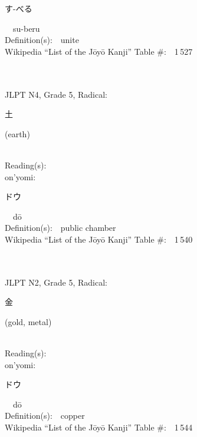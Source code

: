 \begin{multicols}{2}
{\hspace*{2em}}{\begin{CJK}{UTF8}{min} す-べる \end{CJK}}\ \ su-beru\ \ \\
Definition(s):\ \ unite \\
Wikipedia ``List of the J\=oy\=o Kanji'' Table \#:\ \ 1\,527 \\
\ \ \\
{\fontsize{34pt}{40pt}  }\ \ \\  %
{JLPT N4, Grade 5, Radical:\ \ {\begin{CJK}{UTF8}{min} 土 \end{CJK}} (earth) } \\
Reading(s):\ \ \\
{\hspace*{1em}}on'yomi:\ \ \\
{\hspace*{2em}}{\begin{CJK}{UTF8}{min} ドウ \end{CJK}}\ \ d\=o\ \ \\
Definition(s):\ \ public chamber \\
Wikipedia ``List of the J\=oy\=o Kanji'' Table \#:\ \ 1\,540 \\
\ \ \\
{\fontsize{34pt}{40pt}  }\ \ \\  %
{JLPT N2, Grade 5, Radical:\ \ {\begin{CJK}{UTF8}{min} 金 \end{CJK}} (gold, metal) } \\
Reading(s):\ \ \\
{\hspace*{1em}}on'yomi:\ \ \\
{\hspace*{2em}}{\begin{CJK}{UTF8}{min} ドウ \end{CJK}}\ \ d\=o\ \ \\
Definition(s):\ \ copper \\
Wikipedia ``List of the J\=oy\=o Kanji'' Table \#:\ \ 1\,544 \\

\end{multicols}
